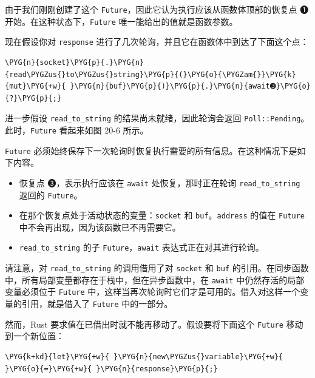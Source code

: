 
由于我们刚刚创建了这个 \texttt{Future}，因此它认为执行应该从函数体顶部的恢复点 ➊ 开始。在这种状态下，\texttt{Future} 唯一能给出的值就是函数参数。

现在假设你对 \texttt{response} 进行了几次轮询，并且它在函数体中到达了下面这个点：

\begin{Verbatim}[commandchars=\\\{\},breaklines=true,breakanywhere=true,fontsize=\codefont,xleftmargin=17bp]
\PYG{n}{socket}\PYG{p}{.}\PYG{n}{read\PYGZus{}to\PYGZus{}string}\PYG{p}{(}\PYG{o}{\PYGZam{}}\PYG{k}{mut}\PYG{+w}{ }\PYG{n}{buf}\PYG{p}{)}\PYG{p}{.}\PYG{n}{await➌}\PYG{o}{?}\PYG{p}{;}
\end{Verbatim}

进一步假设 \texttt{read\_to\_string} 的结果尚未就绪，因此轮询会返回 \texttt{Poll::Pending}。此时，\texttt{Future} 看起来如图 20-6 所示。


\texttt{Future} 必须始终保存下一次轮询时恢复执行需要的所有信息。在这种情况下是如下内容。

\begin{itemize}
\item 恢复点 ➌，表示执行应该在 \texttt{await} 处恢复，那时正在轮询 \texttt{read\_to\_string} 返回的 \texttt{Future}。
\item 在那个恢复点处于活动状态的变量：\texttt{socket} 和 \texttt{buf}。\texttt{address} 的值在 \texttt{Future} 中不会再出现，因为该函数已不再需要它。
\item \texttt{read\_to\_string} 的子 \texttt{Future}，\texttt{await} 表达式正在对其进行轮询。
\end{itemize}

请注意，对 \texttt{read\_to\_string} 的调用借用了对 \texttt{socket} 和 \texttt{buf} 的引用。在同步函数中，所有局部变量都存在于栈中，但在异步函数中，在 \texttt{await} 中仍然存活的局部变量必须位于 \texttt{Future} 中，这样当再次轮询时它们才是可用的。借入对这样一个变量的引用，就是借入了 \texttt{Future} 中的一部分。

然而，Rust 要求值在已借出时就不能再移动了。假设要将下面这个 \texttt{Future} 移动到一个新位置：

\begin{Verbatim}[commandchars=\\\{\},breaklines=true,breakanywhere=true,fontsize=\codefont,xleftmargin=17bp]
\PYG{k+kd}{let}\PYG{+w}{ }\PYG{n}{new\PYGZus{}variable}\PYG{+w}{ }\PYG{o}{=}\PYG{+w}{ }\PYG{n}{response}\PYG{p}{;}
\end{Verbatim}

